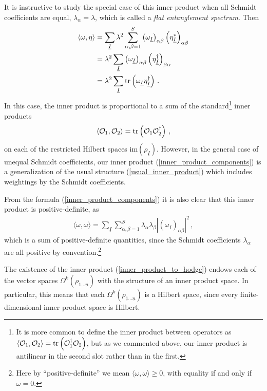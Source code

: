 \documentclass[12pt]{article}
\newcommand{\ul}[1]{{\underline{#1}}}
\numberwithin{equation}{section}
\newcommand{\rhooneton}{{\rho_{\ul{1} \ldots \ul{n}}}}
\begin{document}
It is instructive to study the special case of this inner product when all Schmidt coefficients are equal, $\lambda_\alpha = \lambda$, which is called a \emph{flat entanglement spectrum}. Then
%
\begin{align}\label{inner_product_same_lambdas}
    \langle \omega, \eta \rangle &= \sum_{\ul{I}} \lambda^2 \sum_{\alpha, \beta = 1}^{S} \left( \omega_{\ul{I}} \right)_{\alpha \beta} \left( \eta^\ast_{\ul{I}} \right)_{\alpha \beta} \nonumber \\
    &= \lambda^2 \sum_{\ul{I}} \left( \omega_{\ul{I}} \right)_{\alpha \beta} \left( \eta^\dagger_{\ul{I}} \right)_{\beta \alpha} \nonumber \\
    &= \lambda^2 \sum_{\ul{I}} \tr \left( \omega_{\ul{I}} \eta^\dagger_{\ul{I}} \right) \, .
\end{align}
%
In this case, the inner product is proportional to a sum of the standard\footnote{It is more common to define the inner product between operators as $\langle \mathcal{O}_1 , \mathcal{O}_2 \rangle = \tr \left( \mathcal{O}_1^\dagger \mathcal{O}_2 \right)$, but as we commented above, our inner product is antilinear in the second slot rather than in the first.} inner products
%
\begin{align}\label{usual_inner_product}
    \langle \mathcal{O}_1 , \mathcal{O}_2 \rangle = \tr \left( \mathcal{O}_1 \mathcal{O}_2^\dagger \right) \, ,
\end{align}
%
on each of the restricted Hilbert spaces $\mathrm{im} ( \rho_{\ul{I}} ) $. However, in the general case of unequal Schmidt coefficients, our inner product (\ref{inner_product_components}) is a generalization of the usual structure (\ref{usual_inner_product}) which includes weightings by the Schmidt coefficients.

From the formula (\ref{inner_product_components}) it is also clear that this inner product is positive-definite, as
%
\begin{align}\label{inner_product_pos_def}
    \langle \omega, \omega \rangle = \sum_{\ul{I}} \sum_{\alpha, \beta = 1}^{S} \lambda_\alpha \lambda_\beta \left| \left( \omega_{\ul{I}} \right)_{\alpha \beta} \right|^2 \, ,
\end{align}
%
which is a sum of positive-definite quantities, since the Schmidt coefficients $\lambda_\alpha$ are all positive by convention.\footnote{Here by ``positive-definite'' we mean $\langle \omega , \omega \rangle \geq 0$, with equality if and only if $\omega = 0$.}


The existence of the inner product (\ref{inner_product_to_hodge}) endows each of the vector spaces $\Omega^k ( \rhooneton )$ with the structure of an inner product space. In particular, this means that each $\Omega^k ( \rhooneton )$ is a Hilbert space, since every finite-dimensional inner product space is Hilbert.
\end{document}
